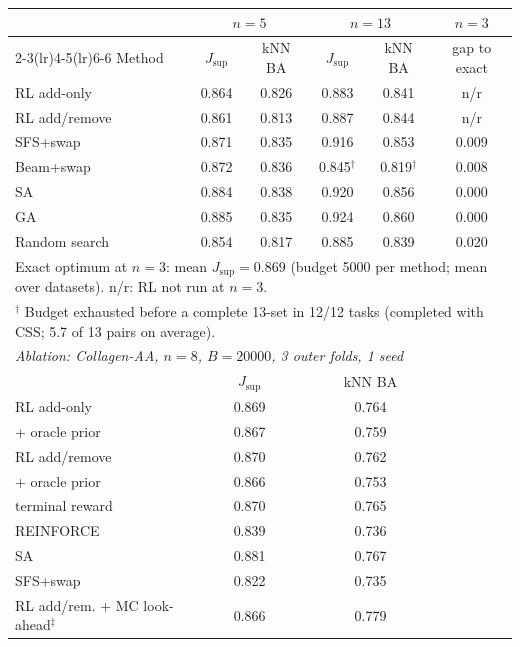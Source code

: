 {\small
\setlength{\tabcolsep}{4pt}
\begin{tabular}{lccccc}
\toprule
 & \multicolumn{2}{c}{$n=5$} & \multicolumn{2}{c}{$n=13$} & $n=3$ \\
\cmidrule(lr){2-3}\cmidrule(lr){4-5}\cmidrule(lr){6-6}
Method & $J_{\mathrm{sup}}$ & kNN BA & $J_{\mathrm{sup}}$ & kNN BA & gap to exact \\
\midrule
RL add-only & 0.864 & 0.826 & 0.883 & 0.841 & n/r \\
RL add/remove & 0.861 & 0.813 & 0.887 & 0.844 & n/r \\
SFS+swap & 0.871 & 0.835 & 0.916 & 0.853 & 0.009 \\
Beam+swap & 0.872 & 0.836 & 0.845$^{\dagger}$ & 0.819$^{\dagger}$ & 0.008 \\
SA & 0.884 & 0.838 & 0.920 & 0.856 & 0.000 \\
GA & 0.885 & 0.835 & 0.924 & 0.860 & 0.000 \\
Random search & 0.854 & 0.817 & 0.885 & 0.839 & 0.020 \\
\multicolumn{6}{l}{\scriptsize Exact optimum at $n=3$: mean $J_{\mathrm{sup}}=0.869$ (budget 5000 per method; mean over datasets). n/r: RL not run at $n=3$.} \\
\multicolumn{6}{l}{\scriptsize $^{\dagger}$ Budget exhausted before a complete 13-set in 12/12 tasks (completed with CSS; 5.7 of 13 pairs on average).} \\
\midrule
\multicolumn{6}{l}{\emph{Ablation: Collagen-AA, $n=8$, $B=20000$, 3 outer folds, 1 seed}} \\
 & \multicolumn{2}{c}{$J_{\mathrm{sup}}$} & \multicolumn{2}{c}{kNN BA} & \\
RL add-only & \multicolumn{2}{c}{0.869} & \multicolumn{2}{c}{0.764} & \\
\quad + oracle prior & \multicolumn{2}{c}{0.867} & \multicolumn{2}{c}{0.759} & \\
RL add/remove & \multicolumn{2}{c}{0.870} & \multicolumn{2}{c}{0.762} & \\
\quad + oracle prior & \multicolumn{2}{c}{0.866} & \multicolumn{2}{c}{0.753} & \\
\quad terminal reward & \multicolumn{2}{c}{0.870} & \multicolumn{2}{c}{0.765} & \\
\quad REINFORCE & \multicolumn{2}{c}{0.839} & \multicolumn{2}{c}{0.736} & \\
SA & \multicolumn{2}{c}{0.881} & \multicolumn{2}{c}{0.767} & \\
SFS+swap & \multicolumn{2}{c}{0.822} & \multicolumn{2}{c}{0.735} & \\
RL add/rem. + MC look-ahead$^{\ddagger}$ & \multicolumn{2}{c}{0.866} & \multicolumn{2}{c}{0.779} & \\
\bottomrule
\end{tabular}
}
